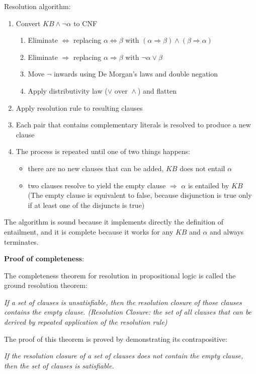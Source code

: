 \documentclass[12pt]{article}
\begin{document}
\begin{enumerate}[label=\textbf{PL.\arabic*}]
    Resolution algorithm:
    \begin{enumerate}[label=\arabic*.]
        \item Convert $KB \land \neg\alpha$ to CNF
        \begin{enumerate}
            \item Eliminate $\Leftrightarrow$ replacing $\alpha\Leftrightarrow\beta$ with $(\alpha\Rightarrow\beta)\land(\beta\Rightarrow\alpha)$
            \item Eliminate $\Rightarrow$ replacing $\alpha\Rightarrow\beta$ with $\neg\alpha\lor\beta$
            \item Move $\lnot$ inwards using De Morgan's laws and double negation
            \item Apply distributivity law ($\lor \text{ over } \land$) and flatten
        \end{enumerate}
        \item Apply resolution rule to resulting clauses
        \item Each pair that contains complementary literals is resolved to produce a new clause
        \item The process is repeated until one of two things happens:
        \begin{itemize}
            \item there are no new clauses that can be added, $KB$ does not entail $\alpha$
            \item two clauses resolve to yield the empty clause $\Rightarrow$ $\alpha$ is entailed by $KB$ (The empty clause is equivalent to false, because disjunction is true only if at least one of the disjuncts is true)
        \end{itemize}
    \end{enumerate}

    The algorithm is sound because it implements directly the definition of entailment, 
    and it is complete because it works for any $KB$ and $\alpha$ and always terminates.

    \textbf{Proof of completeness}:

    The completeness theorem for resolution in propositional logic is called the ground resolution theorem:
    \begin{center}
        \textit{
        If a set of clauses is unsatisfiable, then the resolution closure of those clauses contains the empty clause. 
        (Resolution Closure: the set of all clauses that can be derived by repeated application of the resolution rule)
        }
    \end{center}
    The proof of this theorem is proved by demonstrating its contrapositive:
    \begin{center}
        \textit{
        If the resolution closure of a set of clauses does not contain the empty clause, then the set of clauses is satisfiable.
        }
    \end{center}


\end{enumerate}
\end{document}
